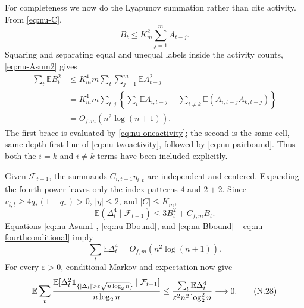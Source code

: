 \documentclass[11pt]{article}
\numberwithin{equation}{section}
\newcommand{\E}{\mathbb E}\newcommand{\Pp}{\mathbb P}
\newcommand{\1}{\mathbf 1}\newcommand{\F}{\mathcal F}\newcommand{\D}{\mathcal D}
\begin{document}
For completeness we now do the Lyapunov summation rather than cite activity.
From \eqref{eq:nu-C},
\begin{equation}\label{eq:nu-Bbound}
 B_t\le K_m^2\sum_{j=1}^m A_{t-j}.
\end{equation}
Squaring and separating equal and unequal labels inside the activity counts,
\eqref{eq:nu-Asum2} gives
\begin{align}
 \sum_t\E B_t^2
 &\le K_m^4m\sum_t\sum_{j=1}^m\E A_{t-j}^2\\
 &=K_m^4m\sum_{t,j}\left\{\sum_i\E A_{i,t-j}
       +\sum_{i\ne k}\E(A_{i,t-j}A_{k,t-j})\right\}\\
 &=O_{f,m}(n^2\log(n+1)).                                    \tag{N.25}
\end{align}
The first brace is evaluated by \eqref{eq:nu-oneactivity}; the second is the
same-cell, same-depth first line of \eqref{eq:nu-twoactivity}, followed by
\eqref{eq:nu-pairbound}.  Thus both the $i=k$ and $i\ne k$ terms have been
included explicitly.

Given $\F_{t-1}$, the summands $C_{i,t-1}\eta_{i,t}$ are independent and
centered.  Expanding the fourth power leaves only the index patterns $4$ and
$2+2$.  Since $v_{i,t}\ge4q_*(1-q_*)>0$, $|\eta|\le2$, and $|C|\le K_m$,
\begin{equation}\label{eq:nu-fourthconditional}
 \E(\Delta_t^4\mid\F_{t-1})
 \le3B_t^2+C_{f,m}B_t.                                       \tag{N.26}
\end{equation}
Equations \eqref{eq:nu-Asum1}, \eqref{eq:nu-Bbound}, and \eqref{eq:nu-Bbound}
--\eqref{eq:nu-fourthconditional} imply
\begin{equation}\label{eq:nu-fourth}
 \sum_t\E\Delta_t^4=O_{f,m}(n^2\log(n+1)).                   \tag{N.27}
\end{equation}
For every $\varepsilon>0$, conditional Markov and expectation now give
\begin{equation}\label{eq:nu-lindeberg}
 \E\sum_t{\E[\Delta_t^2{\bf1}_{\{|\Delta_t|>
 \varepsilon\sqrt{n\log_2n}\}}\mid\F_{t-1}]\over n\log_2n}
 \le {\sum_t\E\Delta_t^4\over
 \varepsilon^2n^2\log_2^2n}\longrightarrow0.                \tag{N.28}
\end{equation}
\end{document}
